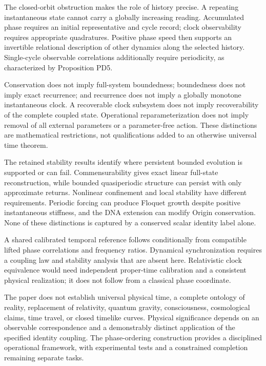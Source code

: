 \documentclass[aip,adv,preprint,floatfix]{revtex4-2}
\begin{document}
The closed-orbit obstruction makes the role of history precise. A repeating instantaneous state cannot carry a globally increasing reading. Accumulated phase requires an initial representative and cycle record; clock observability requires appropriate quadratures. Positive phase speed then supports an invertible relational description of other dynamics along the selected history. Single-cycle observable correlations additionally require periodicity, as characterized by Proposition PD5.

Conservation does not imply full-system boundedness; boundedness does not imply exact recurrence; and recurrence does not imply a globally monotone instantaneous clock. A recoverable clock subsystem does not imply recoverability of the complete coupled state. Operational reparameterization does not imply removal of all external parameters or a parameter-free action. These distinctions are mathematical restrictions, not qualifications added to an otherwise universal time theorem.

The retained stability results identify where persistent bounded evolution is supported or can fail. Commensurability gives exact linear full-state reconstruction, while bounded quasiperiodic structure can persist with only approximate returns. Nonlinear confinement and local stability have different requirements. Periodic forcing can produce Floquet growth despite positive instantaneous stiffness, and the DNA extension can modify Origin conservation. None of these distinctions is captured by a conserved scalar identity label alone.

A shared calibrated temporal reference follows conditionally from compatible lifted phase correlations and frequency ratios. Dynamical synchronization requires a coupling law and stability analysis that are absent here. Relativistic clock equivalence would need independent proper-time calibration and a consistent physical realization; it does not follow from a classical phase coordinate.

The paper does not establish universal physical time, a complete ontology of reality, replacement of relativity, quantum gravity, consciousness, cosmological claims, time travel, or closed timelike curves. Physical significance depends on an observable correspondence and a demonstrably distinct application of the specified identity coupling. The phase-ordering construction provides a disciplined operational framework, with experimental tests and a constrained completion remaining separate tasks.
\end{document}
